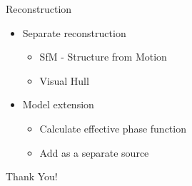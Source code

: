 \documentclass[compress,red,12pt]{beamer}
\begin{document}
%
%
\begin{frame}{Reconstruction}

  \begin{itemize}
  \item Separate reconstruction
    \begin{itemize}
    \item SfM - Structure from Motion 
    \item Visual Hull
    \end{itemize}

  \item Model extension
    \begin{itemize}
    \item Calculate effective phase function
    \item Add as a separate source
    \end{itemize}
  \end{itemize}

\end{frame}


\begin{frame}{}
\end{frame}


\begin{frame}{}
  \begin{center}
    {\huge Thank You!}
  \end{center}
\end{frame}


\appendix
\end{document}
